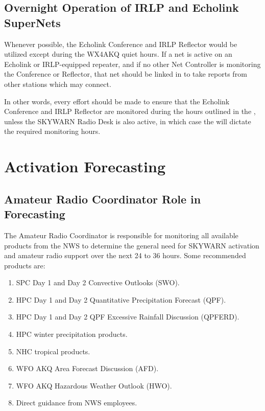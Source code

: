 \documentclass[pdflatex,letterpaper,twoside,12pt]{book}
\begin{document}
\subsection{Overnight Operation of IRLP and Echolink SuperNets}

Whenever possible, the Echolink Conference and IRLP Reflector would be utilized except during the WX4AKQ quiet hours.  If a net is active on an Echolink or IRLP-equipped repeater, and if no other Net Controller is monitoring the Conference or Reflector, that net should be linked in to take reports from other stations which may connect.

In other words, every effort should be made to ensure that the Echolink Conference and IRLP Reflector are monitored during the hours outlined in the , unless the SKYWARN Radio Desk is also active, in which case the  will dictate the required monitoring hours.


\section{Activation Forecasting}

\subsection{Amateur Radio Coordinator Role in Forecasting}

The Amateur Radio Coordinator is responsible for monitoring all available products from the NWS to determine the general need for SKYWARN activation and amateur radio support over the next 24 to 36 hours.  Some recommended products are:

\begin{enumerate}
\item SPC Day 1 and Day 2 Convective Outlooks (SWO).
\item HPC Day 1 and Day 2 Quantitative Precipitation Forecast (QPF).
\item HPC Day 1 and Day 2 QPF Excessive Rainfall Discussion (QPFERD).
\item HPC winter precipitation products.
\item NHC tropical products.
\item WFO AKQ Area Forecast Discussion (AFD).
\item WFO AKQ Hazardous Weather Outlook (HWO).
\item Direct guidance from NWS employees.
\end{enumerate}
\end{document}
